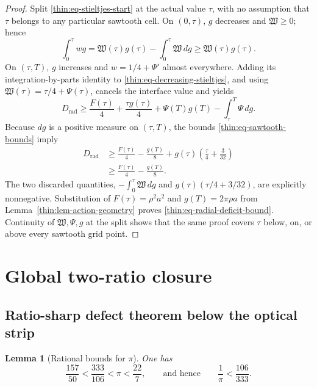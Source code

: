 \documentclass[11pt]{article}
\numberwithin{equation}{section}
\newtheorem{lemma}[theorem]{Lemma}
\theoremstyle{definition}
\theoremstyle{remark}
\begin{document}
\begin{proof}
Split \eqref{thin:eq-stieltjes-start} at the actual value \(\tau\), with
no assumption that \(\tau\) belongs to any particular sawtooth cell.  On
\((0,\tau)\), \(g\) decreases and \(\mathfrak W\geq0\); hence
\begin{equation}
  \int_0^\tau wg
  =\mathfrak W(\tau)g(\tau)-\int_0^\tau \mathfrak W\,dg
  \geq \mathfrak W(\tau)g(\tau).
  \label{thin:eq-decreasing-stieltjes}
\end{equation}
On \((\tau,T)\), \(g\) increases and \(w=1/4+\Psi'\) almost everywhere.
Adding its integration-by-parts identity to
\eqref{thin:eq-decreasing-stieltjes}, and using
\(\mathfrak W(\tau)=\tau/4+\Psi(\tau)\), cancels the interface value and
yields
\[
  D_{\mathrm{rad}}
  \geq \frac{F(\tau)}4+\frac{\tau g(\tau)}4
     +\Psi(T)g(T)-\int_\tau^T\Psi\,dg.
\]
Because \(dg\) is a positive measure on \((\tau,T)\), the bounds
\eqref{thin:eq-sawtooth-bounds} imply
\[
\begin{aligned}
  D_{\mathrm{rad}}
  &\geq \frac{F(\tau)}4-\frac{g(T)}8
    +g(\tau)\left(\frac\tau4+\frac3{32}\right) \\
  &\geq \frac{F(\tau)}4-\frac{g(T)}8.
\end{aligned}
\]
The two discarded quantities,
\(-\int_0^\tau \mathfrak W\,dg\) and
\(g(\tau)(\tau/4+3/32)\), are explicitly nonnegative.  Substitution of
\(F(\tau)=\rho^2a^2\) and \(g(T)=2\pi\rho a\) from
Lemma~\ref{thin:lem-action-geometry} proves
\eqref{thin:eq-radial-deficit-bound}.  Continuity of
\(\mathfrak W,\Psi,g\) at the
split shows that the same proof covers \(\tau\) below, on, or above every
sawtooth grid point.
\end{proof}


\section{Global two-ratio closure}
\label{sec:global-two-owner}

\subsection{Ratio-sharp defect theorem below the optical strip}



\begin{lemma}[Rational bounds for \(\pi\)]
\label{lem:rational-pi-bounds}
One has
\[
 \frac{157}{50}<\frac{333}{106}<\pi<\frac{22}{7},
 \qquad\text{and hence}\qquad \frac1\pi<\frac{106}{333}.
\]
\end{lemma}
\end{document}
